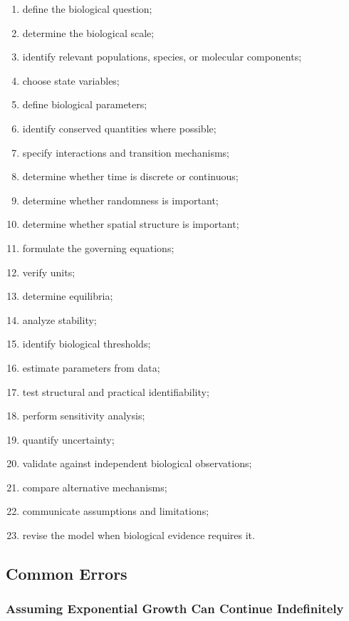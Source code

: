 \begin{enumerate}
    \item define the biological question;
    \item determine the biological scale;
    \item identify relevant populations, species, or molecular components;
    \item choose state variables;
    \item define biological parameters;
    \item identify conserved quantities where possible;
    \item specify interactions and transition mechanisms;
    \item determine whether time is discrete or continuous;
    \item determine whether randomness is important;
    \item determine whether spatial structure is important;
    \item formulate the governing equations;
    \item verify units;
    \item determine equilibria;
    \item analyze stability;
    \item identify biological thresholds;
    \item estimate parameters from data;
    \item test structural and practical identifiability;
    \item perform sensitivity analysis;
    \item quantify uncertainty;
    \item validate against independent biological observations;
    \item compare alternative mechanisms;
    \item communicate assumptions and limitations;
    \item revise the model when biological evidence requires it.
\end{enumerate}

\subsection{Common Errors}
\label{subsec:mathematical-biology-common-errors}

\subsubsection{Assuming Exponential Growth Can Continue Indefinitely}

